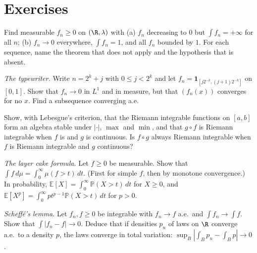 \section{Exercises}

\begin{exercise}[$\star$]\label{ex:fatoustrict}
Find measurable \(f_n\ge0\) on \((\R,\lambda)\) with (a) \(f_n\) decreasing to \(0\) but \(\int f_n=+\infty\) for all \(n\); (b) \(f_n\to0\) everywhere, \(\int f_n=1\), and all \(f_n\) bounded by \(1\). For each sequence, name the theorem that does not apply and the hypothesis that is absent.
\end{exercise}

\begin{exercise}[$\star$]\label{ex:typewriter}
\emph{The typewriter.} Write \(n=2^k+j\) with \(0\le j<2^k\) and let \(f_n=\mathbf 1_{[j2^{-k},(j+1)2^{-k}]}\) on \([0,1]\). Show that \(f_n\to0\) in \(L^1\) and in measure, but that \((f_n(x))\) converges for no \(x\). Find a
subsequence converging a.e.
\end{exercise}

\begin{exercise}[$\star$]\label{ex:riemannalgebra}
Show, with Lebesgue's criterion, that the Riemann integrable functions on \([a,b]\) form an algebra stable under \(|\cdot|\), \(\max\) and \(\min\), and that \(g\circ f\) is Riemann integrable
when \(f\) is and \(g\) is continuous. Is \(f\circ g\) always Riemann integrable when \(f\) is Riemann integrable and \(g\) continuous?
\end{exercise}

\begin{exercise}[$\star\star$]\label{ex:layercake}
\emph{The layer cake formula.} Let \(f\ge0\) be measurable. Show that \(\int f\,d\mu=\int_0^\infty\mu(f>t)\,dt\). (First for simple \(f\), then by monotone convergence.) In probability,
\(\mathbb E[X]=\int_0^\infty\mathbb P(X>t)\,dt\) for \(X\ge0\), and \(\mathbb E[X^p]=\int_0^\infty pt^{p-1}\mathbb P(X>t)\,dt\) for \(p>0\).
\end{exercise}

\begin{exercise}[$\star\star$]\label{ex:scheffe}
\emph{Scheff\'e's lemma.} Let \(f_n,f\ge0\) be integrable with \(f_n\to f\) a.e.\ and \(\int f_n\to\int f\). Show that \(\int|f_n-f|\to0\). Deduce that if densities \(p_n\) of laws on \(\R\) converge a.e.\ to a
density \(p\), the laws converge in total variation: \(\sup_B|\int_Bp_n-\int_Bp|\to0\).
\end{exercise}

